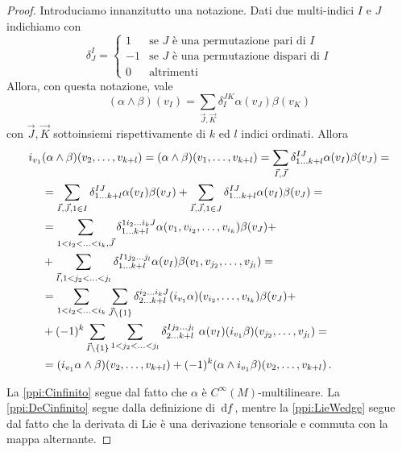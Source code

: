 \begin{proof}
	Introduciamo innanzitutto una notazione. Dati due multi-indici $I$ e $J$ indichiamo con
	\begin{equation*}
		\delta_J^I = \begin{cases}
		             	1 & \text{se } J \text{ è una permutazione pari di }I\\
		             	-1 & \text{se } J \text{ è una permutazione dispari di }I\\
		             	0 & \text{altrimenti}
		             \end{cases}
	\end{equation*}
	Allora, con questa notazione, vale
	\begin{equation*}
		(\alpha\wedge\beta)(v_I) = \sum_{\vec J, \vec K} \delta_I^{JK} \alpha(v_J)\beta(v_K)
	\end{equation*}
	con $\vec J,\vec K$ sottoinsiemi rispettivamente di $k$ ed $l$ indici ordinati. Allora
 	\begin{align*} %
 		i_{v_1}&(\alpha\wedge\beta)(v_2,\ldots, v_{k+l}) = (\alpha\wedge\beta) (\seqb v{k+l},) =
 		\sum_{\vec I,\vec J} \delta_{1\ldots k+l}^{IJ} \alpha(v_I)\beta(v_J) =\\
 		&= \sum_{\vec I,\vec J,1\in I} \delta_{1 \ldots k+l}^{IJ} \alpha(v_I)\beta(v_J) + \sum_{\vec I,\vec J,1\in J} \delta_{1\ldots k+l}^{IJ} \alpha(v_I)\beta(v_J) =\\
 		&= \sum_{1<i_2<\ldots < i_k,\vec J} \delta_{1 \ldots k+l}^{1i_2 \ldots i_kJ}\alpha(v_1,v_{i_2},\ldots,v_{i_k}) \beta(v_J) +\\
 		& +\sum_{\vec I, 1<j_2<\ldots < j_l} \delta_{1 \ldots k+l}^{I1j_2 \ldots j_l}\alpha(v_I) \beta(v_1,v_{j_2},\ldots,v_{j_l}) =\\
 		& = \sum_{1<i_2<\ldots<i_k} \sum_{\vec J\setminus \{1\}} \delta_{2\ldots k+l}^{i_2\ldots i_kJ} (i_{v_1}\alpha)(v_{i_2},\ldots,v_{i_k}) \beta (v_J) +\\
 		& +(-1)^k \sum_{\vec I\setminus \{1\}} \sum_{1<j_2<\ldots<j_l} \delta_{2\ldots k+l}^{Ij_2\ldots j_l}\ \alpha(v_I) (i_{v_1}\beta)(v_{j_2}, \ldots, v_{j_l}) =\\
 		& = (i_{v_1}\alpha \wedge \beta)(v_2, \ldots, v_{k+l}) + (-1)^k (\alpha \wedge i_{v_1}\beta)(v_2, \ldots, v_{k+l}) \punto
 	\end{align*}
 	
 	La \ref{ppi:Cinfinito} segue dal fatto che $\alpha$ è $C^\infty(M)$-multilineare.	
	La \ref{ppi:DeCinfinito} segue dalla definizione di $\,\mathrm d f$, mentre la \ref{ppi:LieWedge} segue dal fatto che la derivata di Lie è una derivazione tensoriale e commuta con la mappa alternante. %
	

\end{proof}
